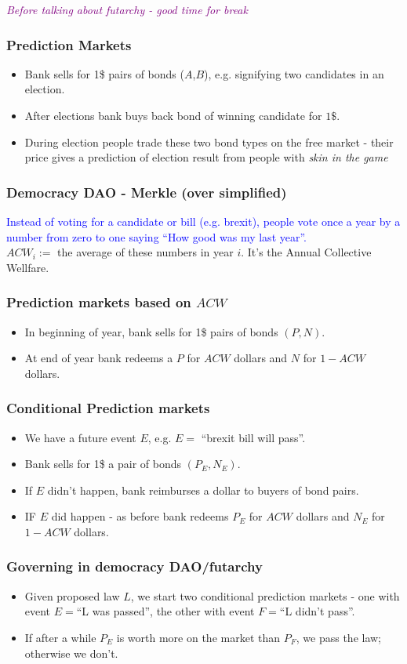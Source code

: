 \documentclass[shadesubsections,compress,14pt,mathserif]{beamer}
\newcommand{\defeq}{\ensuremath{:=}}
\newcommand{\nlnp}{\\ \vspace{0.2in}}
\newcommand{\stitle}[1]{{\large{\textcolor{purple}{\emph{#1}}}}}
\begin{document}
\begin{frame}
 \stitle{Before talking about futarchy - good time for break}
\end{frame}
\begin{frame}
 \frametitle{Prediction Markets}
 \begin{itemize}
  \item Bank sells for 1\$ pairs of bonds ($A$,$B$), e.g. signifying two candidates in an election.\pause
  \item After elections bank buys back bond of winning candidate for $1\$ $.\pause
  \item During election people trade these two bond types  on the free market - their price gives a prediction of 
  election result from people with \emph{skin in the game}
 \end{itemize}

\end{frame}
\begin{frame}
 \frametitle{Democracy DAO - Merkle (over simplified)}
 \textcolor{blue}{Instead of voting for a candidate or bill (e.g. brexit), people vote once a year by
 a number from zero to one saying ``How good was my last year''.}\nlnp
 $ACW_i\defeq$ the average of these numbers in year $i$. It's the Annual Collective Wellfare.
\end{frame}
\begin{frame}
 \frametitle{Prediction markets based on $ACW$}
 \begin{itemize}
  \item In beginning of year, bank sells for 1\$ pairs of bonds $(P,N)$. 
  \item At end of year bank redeems a $P$ for $ACW$ dollars and $N$ for $1-ACW$ dollars.
 \end{itemize}
 
\end{frame}
\begin{frame}
 \frametitle{Conditional Prediction markets}
\begin{itemize}
 \item We have a future event $E$, e.g. $E=$ ``brexit bill will pass''.\pause
 \item Bank sells for 1\$ a pair of bonds $(P_E,N_E)$.\pause
 \item If $E$ didn't happen, bank reimburses a dollar to buyers of bond pairs.\pause
 \item IF $E$ did happen - as before bank redeems $P_E$ for $ACW$ dollars and $N_E$ for $1-ACW$ dollars.
\end{itemize}
\end{frame}
\begin{frame}
 \frametitle{Governing in democracy DAO/futarchy}
 \begin{itemize}
  \item Given proposed law $L$, we start two conditional prediction markets - one with event $E=$``L was passed'',
  the other with event $F=$``L didn't pass''.\pause
  \item If after a while $P_E$ is worth more on the market than $P_F$, we pass the law; otherwise we don't.
 \end{itemize}

\end{frame}
\end{document}
